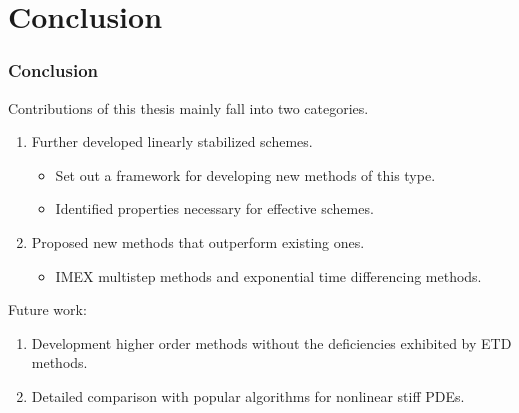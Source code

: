 \documentclass[hyperref={pdfpagelabels=false}]{beamer}
\begin{document}
\section{Conclusion}
\begin{frame}
	\frametitle{Conclusion}
	Contributions of this thesis mainly fall into two categories. 
\begin{enumerate}
	\item Further developed linearly stabilized schemes.
	\begin{itemize}
		\item Set out a framework for developing new methods of this type. 
		
		\item Identified properties necessary for effective schemes. 
	\end{itemize}
	
	\item Proposed new methods that outperform existing ones. 
	\begin{itemize}
		\item IMEX multistep methods and exponential time differencing methods. 
	\end{itemize}
\end{enumerate}	

Future work: 
\begin{enumerate}
	\item Development higher order methods without the deficiencies exhibited by ETD methods.
	
	\item Detailed comparison with popular algorithms for nonlinear stiff PDEs.
\end{enumerate}
\end{frame}
\end{document}
